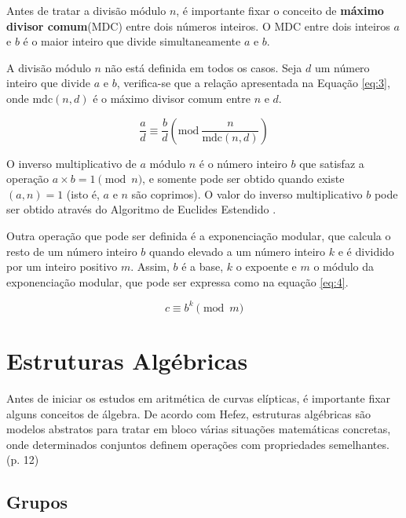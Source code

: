 Antes de tratar a divisão módulo \(n\), é importante fixar o conceito de \textbf{máximo divisor comum}(MDC) entre dois números inteiros. O MDC entre dois inteiros \(a\) e \(b\) 
é o maior inteiro que divide simultaneamente \(a\) e \(b\).

A divisão módulo $n$ não está definida em todos os casos. Seja \(d\) um número inteiro que divide \(a\) e \(b\), verifica-se que a relação apresentada na Equação \ref{eq:3}, onde mdc\((n, d)\) é o máximo divisor comum entre \(n\) e \(d\).

\begin{equation}
  \frac{a}{d} \equiv \frac{b}{d}\left(\mbox{mod}\ \frac{n}{\text{mdc}(n,d)}\right) \label{eq:3}
\end{equation}

O inverso multiplicativo de $a$ módulo \(n\) é o número inteiro \(b\) que satisfaz a operação \(a \times b = 1 \pmod  n\), e somente pode ser obtido quando existe \((a, n) = 1\) (isto é, \(a\) e \(n\) são coprimos). O valor do inverso multiplicativo \(b\) pode ser obtido através do Algoritmo de Euclides Estendido \cite{Halim:2013}.

\par Outra operação que pode ser definida é a exponenciação modular, que calcula o resto de um número inteiro \(b\) quando elevado a um número inteiro \(k\) e é dividido por um inteiro positivo \(m\). Assim, $b$ é a base, $k$ o expoente e $m$ o módulo da exponenciação modular, que pode ser expressa como na equação \ref{eq:4}.

\begin{equation}
  c \equiv b^k\pmod m \label{eq:4}
\end{equation}

%
%
\section{Estruturas Algébricas}

Antes de iniciar os estudos em aritmética de curvas elípticas, é importante
fixar alguns conceitos de álgebra. De acordo com Hefez, estruturas algébricas são modelos abstratos para tratar em bloco várias situações matemáticas concretas, onde determinados conjuntos definem operações com propriedades semelhantes. \cite{Hefez:2008} (p. 12)

%
%
\subsection{Grupos}

